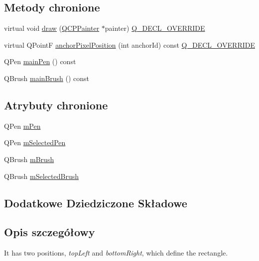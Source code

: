 \subsection*{Metody chronione}
\begin{DoxyCompactItemize}
\item 
virtual void \hyperlink{class_q_c_p_item_rect_a3c492960d0fc038cf1b60578b62b6cdc}{draw} (\hyperlink{class_q_c_p_painter}{Q\+C\+P\+Painter} $\ast$painter) \hyperlink{qcustomplot_8hh_a42cc5eaeb25b85f8b52d2a4b94c56f55}{Q\+\_\+\+D\+E\+C\+L\+\_\+\+O\+V\+E\+R\+R\+I\+DE}
\item 
virtual Q\+PointF \hyperlink{class_q_c_p_item_rect_a844027325b33a3b7eef424128ee5109c}{anchor\+Pixel\+Position} (int anchor\+Id) const \hyperlink{qcustomplot_8hh_a42cc5eaeb25b85f8b52d2a4b94c56f55}{Q\+\_\+\+D\+E\+C\+L\+\_\+\+O\+V\+E\+R\+R\+I\+DE}
\item 
Q\+Pen \hyperlink{class_q_c_p_item_rect_afa0fb7c6328a1e197ecd537de36daf8f}{main\+Pen} () const 
\item 
Q\+Brush \hyperlink{class_q_c_p_item_rect_ab0bd8e272e822ec851ba5b0c20e9200e}{main\+Brush} () const 
\end{DoxyCompactItemize}
\subsection*{Atrybuty chronione}
\begin{DoxyCompactItemize}
\item 
Q\+Pen \hyperlink{class_q_c_p_item_rect_aa0d49323628d6752026056bfb52afd86}{m\+Pen}
\item 
Q\+Pen \hyperlink{class_q_c_p_item_rect_a73cc0bee61de3c67221ec8c7a76a29ed}{m\+Selected\+Pen}
\item 
Q\+Brush \hyperlink{class_q_c_p_item_rect_a2d7f207fada27588b3a52b19234d3c2e}{m\+Brush}
\item 
Q\+Brush \hyperlink{class_q_c_p_item_rect_a21b70eee59b6e19ae0bbdf037b13508f}{m\+Selected\+Brush}
\end{DoxyCompactItemize}
\subsection*{Dodatkowe Dziedziczone Składowe}


\subsection{Opis szczegółowy}
 It has two positions, {\itshape top\+Left} and {\itshape bottom\+Right}, which define the rectangle. 

